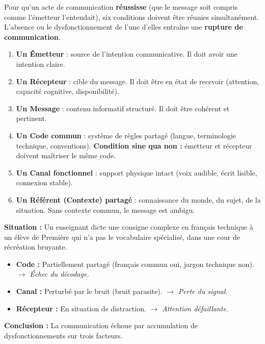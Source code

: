 \documentclass[11pt]{article}
\begin{document}
Pour qu'un acte de communication \textbf{réussisse} (que le message soit compris comme l'émetteur l'entendait), six conditions doivent être réunies simultanément. L'absence ou le dysfonctionnement de l'une d'elles entraîne une \textbf{rupture de communication}.

\begin{aretenir}
\begin{enumerate}
    \item \textbf{Un Émetteur} : source de l'intention communicative. Il doit avoir une intention claire.
    \item \textbf{Un Récepteur} : cible du message. Il doit être en état de recevoir (attention, capacité cognitive, disponibilité).
    \item \textbf{Un Message} : contenu informatif structuré. Il doit être cohérent et pertinent.
    \item \textbf{Un Code commun} : système de règles partagé (langue, terminologie technique, conventions). \textbf{Condition sine qua non :} émetteur et récepteur doivent maîtriser le même code.
    \item \textbf{Un Canal fonctionnel} : support physique intact (voix audible, écrit lisible, connexion stable).
    \item \textbf{Un Référent (Contexte) partagé} : connaissance du monde, du sujet, de la situation. Sans contexte commun, le message est ambigu.
\end{enumerate}
\end{aretenir}

\begin{exemplebox}
\textbf{Situation :} Un enseignant dicte une consigne complexe en français technique à un élève de Première qui n'a pas le vocabulaire spécialisé, dans une cour de récréation bruyante.
\begin{itemize}
    \item \textbf{Code :} Partiellement partagé (français commun oui, jargon technique non). $\rightarrow$ \emph{Échec du décodage.}
    \item \textbf{Canal :} Perturbé par le bruit (bruit parasite). $\rightarrow$ \emph{Perte du signal.}
    \item \textbf{Récepteur :} En situation de distraction. $\rightarrow$ \emph{Attention défaillante.}
\end{itemize}
\textbf{Conclusion :} La communication échoue par accumulation de dysfonctionnements sur trois facteurs.
\end{exemplebox}
\end{document}
